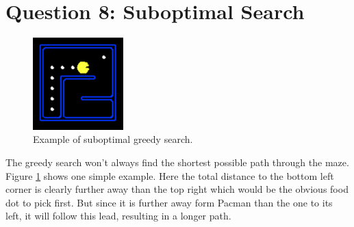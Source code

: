 \documentclass[onecolumn]{article}
\begin{document}
	\section{Question 8: Suboptimal Search}
		
	\begin{figure}
		\includegraphics[width=3.5cm]{p8.PNG}
		\caption{Example of suboptimal greedy search.}
		\label{fig:p8}
	\end{figure} 
	The greedy search won't always find the shortest possible path through the maze. Figure \ref{fig:p8} shows one simple example. Here the total distance to the bottom left corner is clearly further away than the top right which would be the obvious food dot to pick first. But since it is further away form Pacman than the one to its left, it will follow this lead, resulting in a longer path.
	
\end{document}
